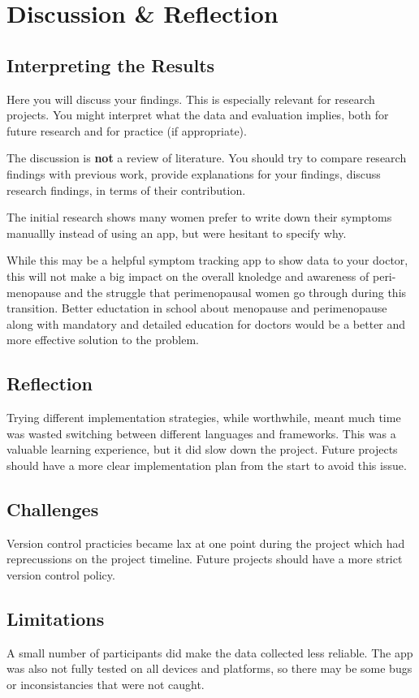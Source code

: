 \section{Discussion \& Reflection}

\subsection{Interpreting the Results}

Here you will discuss your findings. This is especially relevant for research projects. You might 
 interpret what the data and evaluation implies, both for future research and for practice (if appropriate). 
 
 The discussion is \textbf{not} a review of literature. You should try to compare research findings with previous work,
provide  explanations for your findings,
discuss  research findings, in terms of their contribution.

The initial research shows many women prefer to write down their symptoms manuallly instead of using an app, but were hesitant to specify why. 

While this may be a helpful symptom tracking app to show data to your doctor, this will not make a big impact on the overall knoledge and awareness of peri-menopause and the struggle that perimenopausal women go through during this transition. Better eductation in school about menopause and perimenopause along with mandatory and detailed education for doctors would be a better and more effective solution to the problem.

\subsection{Reflection}
Trying different implementation strategies, while worthwhile, meant much time was wasted switching between different languages and frameworks. This was a valuable learning experience, but it did slow down the project. Future projects should have a more clear implementation plan from the start to avoid this issue.

\subsection{Challenges}
Version control practicies became lax at one point during the project which had reprecussions on the project timeline. Future projects should have a more strict version control policy. 

\subsection{Limitations}
A small number of participants did make the data collected less reliable. The app was also not fully tested on all devices and platforms, so there may be some bugs or inconsistancies that were not caught.


